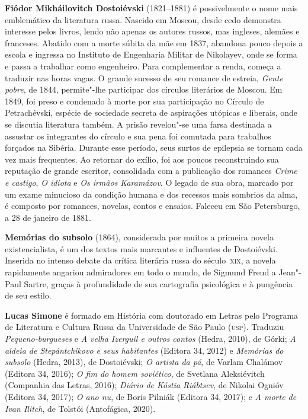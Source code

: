 \textbf{Fiódor Mikháilovitch Dostoiévski} (1821--1881) é possivelmente o nome mais emblemático da literatura russa. Nascido em Moscou, desde cedo demonstra interesse pelos livros, lendo não apenas os autores russos, mas ingleses, alemães e franceses. Abatido com a morte súbita da mãe em 1837, abandona pouco depois a escola e ingressa no Instituto de Engenharia Militar de Nikolayev, onde se forma e passa a trabalhar como engenheiro. Para complementar a renda, começa a traduzir nas horas vagas. O grande sucesso de seu romance de estreia, \textit{Gente pobre}, de 1844, permite"-lhe participar dos círculos literários de Moscou. Em 1849, foi preso e condenado à morte por sua participação no Círculo de Petrachévski, espécie de sociedade secreta de aspirações utópicas e liberais, onde se discutia literatura também. A prisão revelou"-se uma farsa destinada a assustar os integrantes do círculo e sua pena foi comutada para trabalhos forçados na Sibéria. Durante esse período, seus surtos de epilepsia se tornam cada vez mais frequentes. Ao retornar do exílio, foi aos poucos reconstruindo sua reputação de grande escritor, consolidada com a publicação dos romances \textit{Crime e castigo}, \textit{O idiota} e \textit{Os irmãos Karamázov}. O legado de sua obra, marcado por um exame minucioso da condição humana e dos recessos mais sombrios da alma, é composto por romances, novelas, contos e ensaios. Faleceu em São Petersburgo, a 28 de janeiro de 1881.

\textbf{Memórias do subsolo} (1864), considerada por muitos a primeira
novela existencialista, é um dos textos mais marcantes e influentes de Dostoiévski. 
Inserida no intenso debate da crítica literária russa do século~\textsc{xix}, a novela 
rapidamente angariou admiradores em todo o mundo, de Sigmund Freud a Jean"-Paul Sartre,
graças à profundidade de sua cartografia psicológica e à pungência de seu estilo.
        
\textbf{Lucas Simone} é formado em História com doutorado em Letras pelo Programa de Literatura e Cultura Russa da Universidade de São Paulo (\textsc{usp}). Traduziu \textit{Pequeno-burgueses} e \textit{A velha Izerguil e outros contos} (Hedra, 2010), de Górki; \textit{A aldeia de Stepántchikovo e seus habitantes} (Editora 34, 2012) e \textit{Memórias do subsolo} (Hedra, 2013), de Dostoiévski; \textit{O artista da pá}, de Varlam Chalámov (Editora 34, 2016); \textit{O fim do homem soviético}, de Svetlana Aleksiévitch (Companhia das Letras, 2016); \textit{Diário de Kóstia Riábtsev}, de Nikolai Ognióv (Editora 34, 2017); \textit{O ano nu}, de Boris Pilniák (Editora 34, 2017); e \textit{A morte de Ivan Ilitch}, de Tolstói (Antofágica, 2020).


